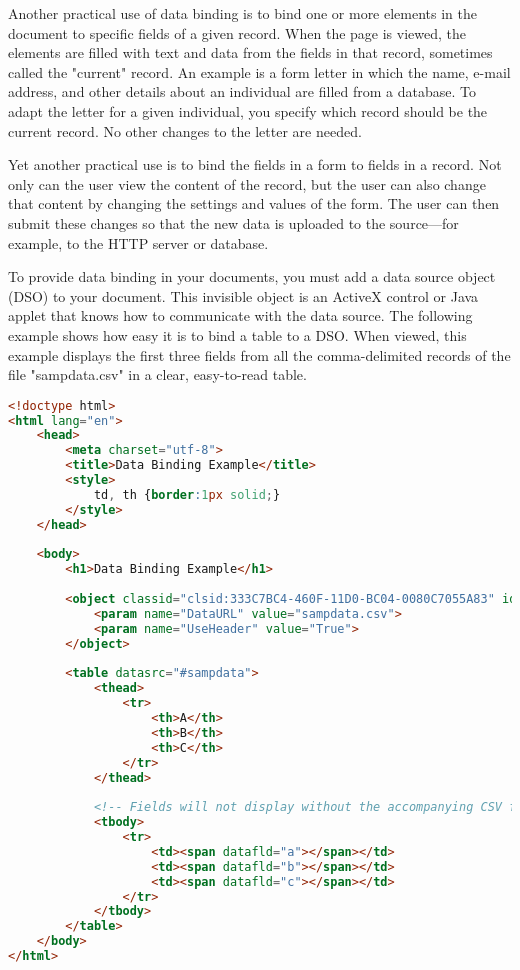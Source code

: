 Another practical use of data binding is to bind one or more elements in the document to specific fields of a given record. When the page is viewed, the elements are filled with text and data from the fields in that record, sometimes called the "current" record. An example is a form letter in which the name, e-mail address, and other details about an individual are filled from a database. To adapt the letter for a given individual, you specify which record should be the current record. No other changes to the letter are needed.


Yet another practical use is to bind the fields in a form to fields in a record. Not only can the user view the content of the record, but the user can also change that content by changing the settings and values of the form. The user can then submit these changes so that the new data is uploaded to the source—for example, to the HTTP server or database.


To provide data binding in your documents, you must add a data source object (DSO) to your document. This invisible object is an ActiveX control or Java applet that knows how to communicate with the data source. The following example shows how easy it is to bind a table to a DSO. When viewed, this example displays the first three fields from all the comma-delimited records of the file "sampdata.csv" in a clear, easy-to-read table.


\begin{lstlisting}[language=HTML]
<!doctype html>
<html lang="en">
    <head>
        <meta charset="utf-8">
        <title>Data Binding Example</title>
        <style>
            td, th {border:1px solid;}
        </style>
    </head>
 
    <body>
        <h1>Data Binding Example</h1>
 
        <object classid="clsid:333C7BC4-460F-11D0-BC04-0080C7055A83" id="sampdata">
            <param name="DataURL" value="sampdata.csv">
            <param name="UseHeader" value="True">
        </object>
 
        <table datasrc="#sampdata">
            <thead>
                <tr>
                    <th>A</th>
                    <th>B</th>
                    <th>C</th>
                </tr>
            </thead>
 
            <!-- Fields will not display without the accompanying CSV file. -->
            <tbody>
                <tr>
                    <td><span datafld="a"></span></td>
                    <td><span datafld="b"></span></td>
                    <td><span datafld="c"></span></td>
                </tr>
            </tbody>
        </table>
    </body>
</html>
\end{lstlisting}
























